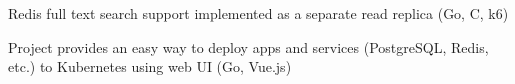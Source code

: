 \documentclass[10pt,a4paper,ragged2e,withhyper]{altacv}
\begin{document}
\begin{paracol}{2}


Redis full text search support implemented as a separate read replica (Go, C, k6)


\divider


Project provides an easy way to deploy apps and services (PostgreSQL, Redis, etc.) to Kubernetes using web UI (Go, Vue.js)



\end{paracol}
\end{document}
